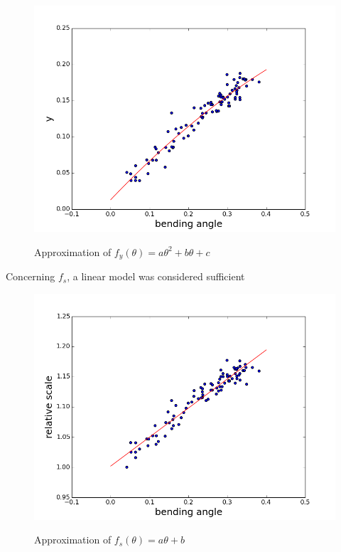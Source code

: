 \documentclass[11pt]{report}
\begin{document}
\begin{figure}[H]
    \begin{center}
        \includegraphics[scale=0.5]{images/model-quadratic-y.png}
        \label{fig:newmodelY}
        \caption{Approximation of $f_y(\theta) = a\theta^2 + b\theta + c$}
    \end{center}
\end{figure}

Concerning $f_s$, a linear model was considered sufficient

\begin{figure}[H]
    \begin{center}
        \includegraphics[scale=0.5]{images/model-scale.png}
        \label{fig:newmodelS}
        \caption{Approximation of $f_s(\theta) = a\theta+b$}
    \end{center}
\end{figure}
\end{document}
